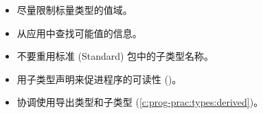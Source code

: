 \begin{itemize}
    \item 尽量限制标量类型的值域。
    \item 从应用中查找可能值的信息。
    \item 不要重用标准 (Standard) 包中的子类型名称。
    \item 用子类型声明来促进程序的可读性 (\cite{booch87})。
    \item 协调使用导出类型和子类型 (\ref{c:prog-prac:types:derived})。

\end{itemize}
